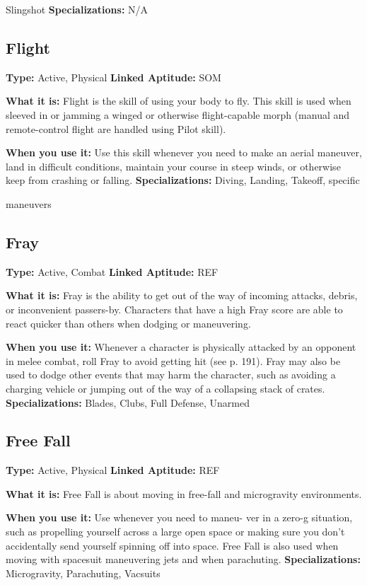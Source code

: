 Slingshot
\textbf{Specializations:} N/A

\subsection{Flight}

\textbf{Type:} Active, Physical
\textbf{Linked Aptitude:} SOM

\textbf{What it is:} Flight is the skill of using your body to 
fly. This skill is used when sleeved in or jamming a 
winged or otherwise flight-capable morph (manual and 
remote-control flight are handled using Pilot skill).

\textbf{When you use it:} Use this skill whenever you need to 
make an aerial maneuver, land in difficult conditions, 
maintain your course in steep winds, or otherwise 
keep from crashing or falling.
\textbf{Specializations:} Diving, Landing, Takeoff, specific 

maneuvers

\subsection{Fray}

\textbf{Type:} Active, Combat
\textbf{Linked Aptitude:} REF

\textbf{What it is:} Fray is the ability to get out of the way 
of incoming attacks, debris, or inconvenient passers-by. 
Characters that have a high Fray score are able to react 
quicker than others when dodging or maneuvering.

\textbf{When you use it:} Whenever a character is physically 
attacked by an opponent in melee combat, roll Fray to 
avoid getting hit (see p. 191). Fray may also be used 
to dodge other events that may harm the character, 
such as avoiding a charging vehicle or jumping out of 
the way of a collapsing stack of crates.
\textbf{Specializations:} Blades, Clubs, Full Defense, Unarmed

\subsection{Free Fall}

\textbf{Type:} Active, Physical
\textbf{Linked Aptitude:} REF

\textbf{What it is:} Free Fall is about moving in free-fall and 
microgravity environments.

\textbf{When you use it:} Use whenever you need to maneu-
ver in a zero-g situation, such as propelling yourself 
across a large open space or making sure you don't 
accidentally send yourself spinning off into space. 
Free Fall is also used when moving with spacesuit 
maneuvering jets and when parachuting.
\textbf{Specializations:} Microgravity, Parachuting, Vacsuits


